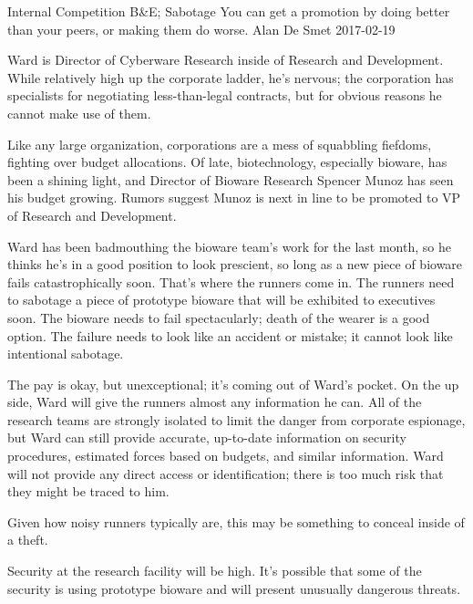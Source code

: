 \begin{scenario}{Internal Competition}
	{B\&E; Sabotage}
	{You can get a promotion by doing better than your peers, or making them do worse.}
	{Alan De Smet}
	{2017-02-19}
	{}

 Ward is Director of Cyberware Research inside of Research and Development.  While relatively high up the corporate ladder, he's nervous; the corporation has specialists for negotiating less-than-legal contracts, but for obvious reasons he cannot make use of them.

\synopsis Like any large organization, corporations are a mess of squabbling fiefdoms, fighting over budget allocations.  Of late, biotechnology, especially bioware, has been a shining light, and Director of Bioware Research Spencer Munoz has seen his budget growing. Rumors suggest Munoz is next in line to be promoted to VP of Research and Development.

Ward has been badmouthing the bioware team's work for the last month, so he thinks he's in a good position to look prescient, so long as a new piece of bioware fails catastrophically soon.  That's where the runners come in.  The runners need to sabotage a piece of prototype bioware that will be exhibited to executives soon.  The bioware needs to fail spectacularly; death of the wearer is a good option.  The failure needs to look like an accident or mistake; it cannot look like intentional sabotage.

The pay is okay, but unexceptional; it's coming out of Ward's pocket.  On the up side, Ward will give the runners almost any information he can. All of the research teams are strongly isolated to limit the danger from corporate espionage, but Ward can still provide accurate, up-to-date information on security procedures, estimated forces based on budgets, and similar information.  Ward will not provide any direct access or identification; there is too much risk that they might be traced to him.

\notes Given how noisy runners typically are, this may be something to conceal inside of a theft.

Security at the research facility will be high.  It's possible that some of the security is using prototype bioware and will present unusually dangerous threats.  

\end{scenario}
